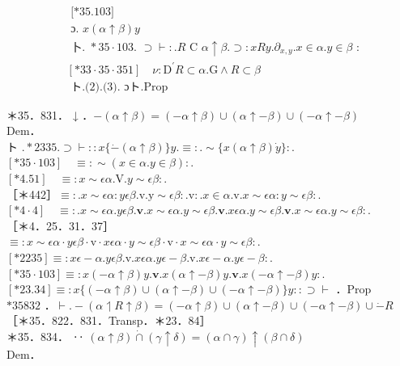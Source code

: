 \documentclass[10pt]{article}
\begin{document}
\begin{align*}
& \text { [*35.103] } \\
& \text { ɔ. } x(\alpha \uparrow \beta) y  \tag{2}\\
& \text { 卜. } * 35 \cdot 103 \text {. } \supset \vdash: . R \text { C } \alpha \uparrow \beta . \supset: x R y . \partial_{x, y} . x \in \alpha . y \in \beta \text { : } \\
& {[* 33 \cdot 35 \cdot 351] \quad \nu: \mathrm{D}^{\prime} R \subset \alpha . \mathrm{G} \wedge R \subset \beta}  \tag{3}\\
& \text { ト.(2).(3). ɔト.Prop }
\end{align*}


＊35．831． ↓ ．$-(\alpha \uparrow \beta)=(-\alpha \uparrow \beta) \cup(\alpha \uparrow-\beta) \cup(-\alpha \uparrow-\beta)$\\
Dem．\\
ト $. * 2335 . \supset \vdash:: x\{\dot{-}(\alpha \uparrow \beta)\} y . \equiv: . \sim\{x(\alpha \uparrow \beta) \dot{y}\}:$.\\
$[* 35 \cdot 103] \quad \equiv: \sim(x \in \alpha . y \in \beta):$.\\
$[* 4.51] \quad \equiv: x \sim \epsilon \alpha . \mathrm{V} . y \sim \epsilon \beta:$.\\
［＊442］$\equiv: . x \sim \epsilon \alpha: y \epsilon \beta . \mathrm{v} . \mathrm{y} \sim \epsilon \beta: . \mathrm{v}: . x \in \alpha . \mathrm{v} . x \sim \epsilon \alpha: y \sim \epsilon \beta:$.\\
$[* 4 \cdot 4] \quad \equiv: . x \sim \epsilon \alpha . y \epsilon \beta . \mathbf{v} . x \sim \epsilon \alpha . y \sim \epsilon \beta . \mathbf{v} . x \epsilon \alpha . y \sim \epsilon \beta . \mathbf{v} . x \sim \epsilon \alpha . y \sim \epsilon \beta:$.\\
［＊4．25．31．37］\\
$\equiv: x \sim \epsilon \alpha \cdot y \epsilon \beta \cdot \mathrm{v} \cdot x \epsilon \alpha \cdot y \sim \epsilon \beta \cdot \mathrm{v} \cdot x \sim \epsilon \alpha \cdot y \sim \epsilon \beta:$.\\
$[* 2235] \equiv: x \epsilon-\alpha . y \epsilon \beta . \mathrm{v} . x \epsilon \alpha . y \epsilon-\beta . \mathrm{v} . x \epsilon-\alpha . y \epsilon-\beta:$.\\
$[* 35 \cdot 103] \equiv: x(-\alpha \uparrow \beta) y . \mathbf{v} . x(\alpha \uparrow-\beta) y . \mathbf{v} . x(-\alpha \uparrow-\beta) y:$.\\
$[* 23.34] \equiv: x\{(-\alpha \uparrow \beta) \cup(\alpha \uparrow-\beta) \cup(-\alpha \uparrow-\beta)\} y:: \supset \vdash$ ．Prop\\
$* 35832$ ．$\vdash .-(\alpha \upharpoonleft R \uparrow \beta)=(-\alpha \uparrow \beta) \cup(\alpha \uparrow-\beta) \cup(-\alpha \uparrow-\beta) \cup \dot{-} R$\\
［＊35．822．831．Transp．＊23．84］\\
＊35．834． ‥ $(\alpha \uparrow \beta) \dot{\cap}(\gamma \uparrow \delta)=(\alpha \cap \gamma) \uparrow(\beta \cap \delta)$\\
Dem．
\end{document}
